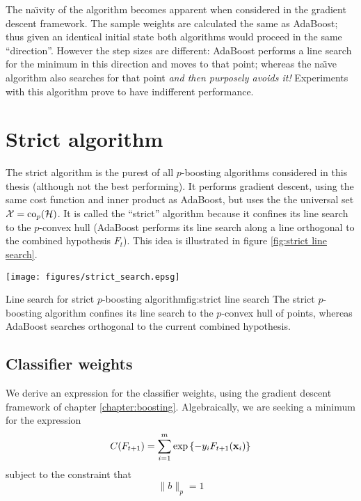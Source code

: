 The na\"{\i}vity of the algorithm becomes apparent when considered in
the gradient descent framework.  The sample weights are calculated
the same as AdaBoost; thus given an identical initial state both
algorithms would proceed in the same ``direction''.  However the step
sizes are different: AdaBoost performs a line search for the minimum
in this direction and moves to that point; whereas the na\"{\i}ve algorithm
also searches for that point \emph{and then purposely avoids it!}
Experiments with this algorithm prove to have indifferent performance.

\section{Strict algorithm}

The strict algorithm is the purest of all $p$-boosting algorithms
considered in this thesis (although not the best performing).  It
performs gradient descent, using the 
same cost function and inner product as AdaBoost, but uses the the
universal set $\mathcal{X} = \mathrm{co}_p(\mathcal{H})$.  It is called the ``strict''
algorithm because it confines its line search to the $p$-convex hull
(AdaBoost performs its line search along a line orthogonal to the
combined hypothesis $F_{t}$).  This idea is illustrated in figure
\ref{fig:strict line search}. 

\begin{linefigure}
\begin{center}
\texttt{[image: figures/strict\_search.epsg]}
\end{center}
\begin{capt}{Line search for strict $p$-boosting algorithm}{fig:strict
line search}
The strict $p$-boosting algorithm confines its line search to the
$p$-convex hull of points, whereas AdaBoost searches orthogonal to the
current combined hypothesis.
\end{capt}
\end{linefigure}

\subsection{Classifier weights}

We derive an expression for the classifier weights, using the gradient
descent framework of chapter \ref{chapter:boosting}.  Algebraically, we
are seeking a minimum for the expression 
%
\begin{equation}
\label{eqn:classifier weight cost function approximation}
C(F_{t+1}) = \sum_{i=1}^{m} \exp \left\{ -y_i F_{t+1}(\mathbf{x}_i) \right\}
\end{equation}
%
subject to the constraint that
%
\begin{equation}
\| b \|_{p} = 1
\end{equation}

